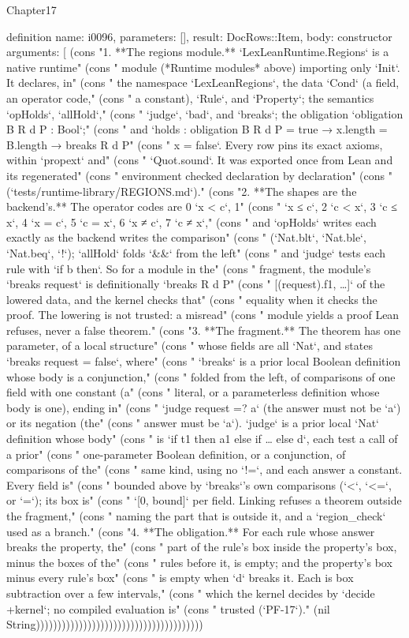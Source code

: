 \begin{lexlean}{Chapter17}
\begin{semanticmodule}
definition{
  name: i0096,
  parameters: [],
  result: DocRows::Item,
  body: constructor{
    arguments: [
      (cons "1. **The regions module.** `LexLeanRuntime.Regions` is a native runtime" (cons "   module (*Runtime modules* above) importing only `Init`. It declares, in" (cons "   the namespace `LexLeanRegions`, the data `Cond` (a field, an operator code," (cons "   a constant), `Rule`, and `Property`; the semantics `opHolds`, `allHold`," (cons "   `judge`, `bad`, and `breaks`; the obligation `obligation B R d P : Bool`;" (cons "   and `holds : obligation B R d P = true → x.length = B.length → breaks R d P" (cons "   x = false`. Every row pins its exact axioms, within `propext` and" (cons "   `Quot.sound`. It was exported once from Lean and its regenerated" (cons "   environment checked declaration by declaration" (cons "   (`tests/runtime-library/REGIONS.md`)." (cons "2. **The shapes are the backend's.** The operator codes are 0 `x < c`, 1" (cons "   `x ≤ c`, 2 `c < x`, 3 `c ≤ x`, 4 `x = c`, 5 `c = x`, 6 `x ≠ c`, 7 `c ≠ x`," (cons "   and `opHolds` writes each exactly as the backend writes the comparison" (cons "   (`Nat.blt`, `Nat.ble`, `Nat.beq`, `!`); `allHold` folds `&&` from the left" (cons "   and `judge` tests each rule with `if b then`. So for a module in the" (cons "   fragment, the module's `breaks request` is definitionally `breaks R d P" (cons "   [(request).f1, …]` of the lowered data, and the kernel checks that" (cons "   equality when it checks the proof. The lowering is not trusted: a misread" (cons "   module yields a proof Lean refuses, never a false theorem." (cons "3. **The fragment.** The theorem has one parameter, of a local structure" (cons "   whose fields are all `Nat`, and states `breaks request = false`, where" (cons "   `breaks` is a prior local Boolean definition whose body is a conjunction," (cons "   folded from the left, of comparisons of one field with one constant (a" (cons "   literal, or a parameterless definition whose body is one), ending in" (cons "   `judge request =? a` (the answer must not be `a`) or its negation (the" (cons "   answer must be `a`). `judge` is a prior local `Nat` definition whose body" (cons "   is `if t1 then a1 else if … else d`, each test a call of a prior" (cons "   one-parameter Boolean definition, or a conjunction, of comparisons of the" (cons "   same kind, using no `!=`, and each answer a constant. Every field is" (cons "   bounded above by `breaks`'s own comparisons (`<`, `<=`, or `=`); its box is" (cons "   `[0, bound]` per field. Linking refuses a theorem outside the fragment," (cons "   naming the part that is outside it, and a `region_check` used as a branch." (cons "4. **The obligation.** For each rule whose answer breaks the property, the" (cons "   part of the rule's box inside the property's box, minus the boxes of the" (cons "   rules before it, is empty; and the property's box minus every rule's box" (cons "   is empty when `d` breaks it. Each is box subtraction over a few intervals," (cons "   which the kernel decides by `decide +kernel`; no compiled evaluation is" (cons "   trusted (`PF-17`)." (nil String)))))))))))))))))))))))))))))))))))))))
}}
\end{semanticmodule}
\end{lexlean}
